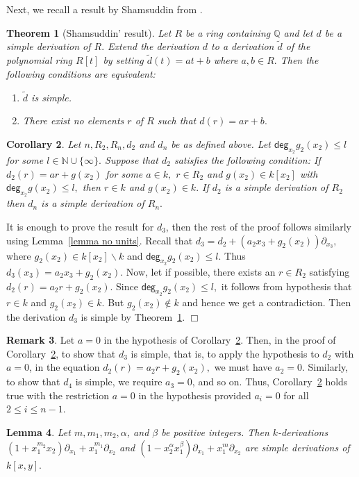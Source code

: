 \documentclass[12pt,reqno]{amsart}
\renewcommand{\deg}{\mathsf{deg}}
\renewcommand{\setminus}{\smallsetminus}
\renewcommand{\leq}{\leqslant}
\newtheorem{thm}{Theorem}
\numberwithin{thm}{section}
\newtheorem{cor}[thm]{Corollary}
\newtheorem{lem}[thm]{Lemma}
\theoremstyle{definition}
\newtheorem{rem}[thm]{Remark}
\numberwithin{equation}{thm}
\renewenvironment{proof}{\par\noindent {\em Proof:}}{\hfill$\Box$\medskip}
\theoremstyle{plain}
\begin{document}
Next, we recall a result by Shamsuddin from \cite{Sham77}.
\begin{thm}[Shamsuddin' result]\label{Sham result}
 Let $R$ be a ring containing $\mathbb{Q}$ and let $d$ be a simple derivation of $R.$ Extend the derivation $d$ to a derivation $\tilde{d}$ of the polynomial ring $R[t]$ by setting $\tilde{d}(t)=at+b$ where $a,b\in R.$ Then the following conditions are equivalent:
 \begin{enumerate}
     \item[(i)] $\tilde{d}$ is simple.
     \item[(ii)] There exist no elements $r$ of $R$ such that $d(r)=ar+b.$
 \end{enumerate}
\end{thm}
\begin{cor}\label{cor simple}
    Let $n,R_2,R_n,d_2$ and $d_n$ be as defined above. Let $\deg_{x_2}g_2(x_2)\leq l$ for some $l \in \mathbb{N} \cup  \{\infty\}.$ Suppose that $d_2$ satisfies the following condition: If $d_2(r)=ar+g(x_2)$ for some $a\in k,$ $r\in R_2$ and $g(x_2)\in k[x_2]$ with $\deg_{x_2}g(x_2)\leq l,$ then $r\in k$ and $g(x_2)\in k.$ If $d_2$ is a simple derivation of $R_2$ then $d_n$ is a simple derivation of $R_n.$
\end{cor}
\begin{proof}
    It is enough to prove the result for $d_3$, then the rest of the proof follows similarly using Lemma~\ref{lemma no units}. Recall that $d_3=d_2+(a_2x_3+g_2(x_2))\partial_{x_3},$ where $g_2(x_2)\in k[x_2]\setminus k$ and $\deg_{x_2}g_2(x_2)\leq l.$ Thus $d_3(x_3)=a_2x_3+g_2(x_2)$. Now, let if possible, there exists an $r\in R_2$ satisfying $d_2(r)=a_2r+g_2(x_2)$. Since $\deg_{x_2}g_2(x_2)\leq l,$ it follows from hypothesis that $r\in k$ and $g_2(x_2)\in k.$ But $g_2(x_2)\notin k$ and hence we get a contradiction. Then the derivation $d_3$ is simple by Theorem~\ref{Sham result}. 
\end{proof}
\begin{rem}
    Let $a=0$ in the hypothesis of Corollary~\ref{cor simple}. Then, in the proof of Corollary~\ref{cor simple}, to show that $d_3$ is simple, that is, to apply the hypothesis to $d_2$ with $a=0$, in the equation $d_2(r)=a_2r+g_2(x_2),$ we must have $a_2=0$. Similarly, to show that $d_4$ is simple, we require $a_3=0$, and so on. Thus, Corollary~\ref{cor simple} holds true with the restriction $a=0$ in the hypothesis provided $a_i=0$ for all $2\leq i \leq n-1.$  
\end{rem}
\begin{lem}\label{lem simple}
    Let $m,m_1,m_2,\alpha$, and $\beta$ be positive integers. Then $k$-derivations $(1+x_1^{m_2}x_2)\partial_{x_1}+x_1^{m_1}\partial_{x_2}$ and $(1-x_2^{\alpha} x_1^{\beta})\partial_{x_1} +x_1^m\partial_{x_2}$ are simple derivations of $k[x,y].$
\end{lem}
\end{document}
